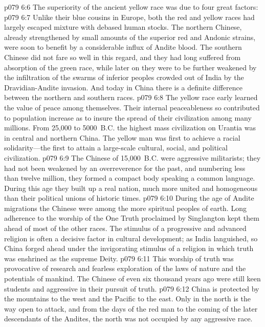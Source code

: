\vs p079 6:6 The superiority of the ancient yellow race was due to four great factors:
\pc \vs p079 6:7 \bibnobreakspace {} Unlike their blue cousins in Europe, both the red and yellow races had largely escaped mixture with debased human stocks. The northern Chinese, already strengthened by small amounts of the superior red and Andonic strains, were soon to benefit by a considerable influx of Andite blood. The southern Chinese did not fare so well in this regard, and they had long suffered from absorption of the green race, while later on they were to be further weakened by the infiltration of the swarms of inferior peoples crowded out of India by the Dravidian\hyp{}Andite invasion. And today in China there is a definite difference between the northern and southern races.
\pc \vs p079 6:8 \bibnobreakspace {} The yellow race early learned the value of peace among themselves. Their internal peaceableness so contributed to population increase as to insure the spread of their civilization among many millions. From 25,000 to 5000~B.C. the highest mass civilization on Urantia was in central and northern China. The yellow man was first to achieve a racial solidarity---the first to attain a large\hyp{}scale cultural, social, and political civilization.
\vs p079 6:9 The Chinese of 15,000~B.C. were aggressive militarists; they had not been weakened by an overreverence for the past, and numbering less than twelve million, they formed a compact body speaking a common language. During this age they built up a real nation, much more united and homogeneous than their political unions of historic times.
\pc \vs p079 6:10 \bibnobreakspace {} During the age of Andite migrations the Chinese were among the more spiritual peoples of earth. Long adherence to the worship of the One Truth proclaimed by Singlangton kept them ahead of most of the other races. The stimulus of a progressive and advanced religion is often a decisive factor in cultural development; as India languished, so China forged ahead under the invigorating stimulus of a religion in which truth was enshrined as the supreme Deity.
\vs p079 6:11 This worship of truth was provocative of research and fearless exploration of the laws of nature and the potentials of mankind. The Chinese of even six thousand years ago were still keen students and aggressive in their pursuit of truth.
\pc \vs p079 6:12 \bibnobreakspace {} China is protected by the mountains to the west and the Pacific to the east. Only in the north is the way open to attack, and from the days of the red man to the coming of the later descendants of the Andites, the north was not occupied by any aggressive race.
